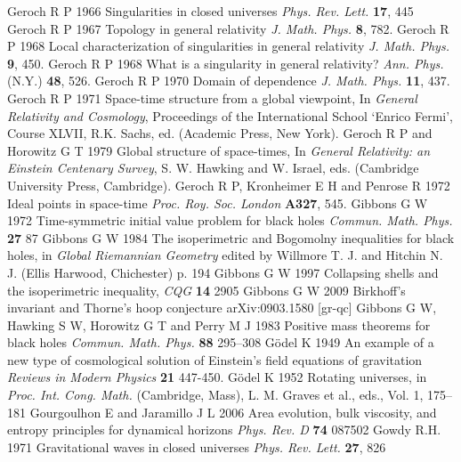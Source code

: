 \documentclass[12pt]{iopart}
\begin{document}
\begin{thebibliography}{999}
 Geroch R P 1966 Singularities in closed universes {\it Phys. Rev. Lett.} {\bf 17}, 445%
 Geroch R P 1967 Topology in general relativity {\it J. Math. Phys.} {\bf 8}, 782.%
 Geroch R P 1968 Local characterization of singularities in general relativity {\it J. Math. Phys.} {\bf 9},
450. %
 Geroch R P 1968 What is a singularity in general relativity? {\it Ann. Phys. }(N.Y.) {\bf 48}, 526.%
 Geroch R P 1970 Domain of dependence {\it J. Math. Phys.} {\bf 11}, 437.%
 Geroch R P 1971 Space-time structure from a global viewpoint,  In {\it General Relativity and Cosmology},
Proceedings of the International School `Enrico Fermi', Course XLVII, R.K.
Sachs, ed. (Academic Press, New York).%
 Geroch R P and Horowitz G T 1979 Global structure of space-times,  In {\it General Relativity:
an Einstein Centenary Survey}, S. W. Hawking and W. Israel, eds. (Cambridge
University Press, Cambridge).%
 Geroch R P, Kronheimer E H and Penrose R 1972 Ideal points in space-time
{\it Proc. Roy. Soc. London} {\bf A327}, 545.
 Gibbons G W 1972 Time-symmetric initial value problem for black holes {\it Commun. Math. Phys.} {\bf 27}  87%
 Gibbons G W 1984 The isoperimetric and Bogomolny inequalities for black holes,  in {\it Global Riemannian Geometry} edited by Willmore T. J.
and Hitchin N. J. (Ellis Harwood, Chichester) p. 194
 Gibbons G W 1997 Collapsing shells and the isoperimetric inequality, {\it CQG} {\bf 14} 2905
 Gibbons G W 2009 Birkhoff's invariant and Thorne's hoop conjecture
arXiv:0903.1580 [gr-qc]
 Gibbons G W, Hawking S W, Horowitz G T and Perry M J 1983 Positive mass theorems for black holes {\it Commun. Math. Phys.} {\bf 88} 295--308
 G\"odel K 1949 An example of a new 
type of cosmological solution of Einstein's field equations of 
gravitation {\it Reviews in Modern Physics} {\bf 21} 447-450.
 G\"odel K 1952 Rotating universes, in {\it Proc. Int. Cong. Math.} (Cambridge,
Mass), L. M. Graves et al., eds., Vol. 1, 175--181
 Gourgoulhon E and Jaramillo J L 2006
Area evolution, bulk viscosity, and entropy principles for dynamical horizons 
{\it Phys. Rev. D} {\bf 74} 087502
 Gowdy R.H. 1971 Gravitational waves in closed universes {\it Phys. Rev. Lett.} {\bf 27}, 826

\end{thebibliography}
\end{document}
